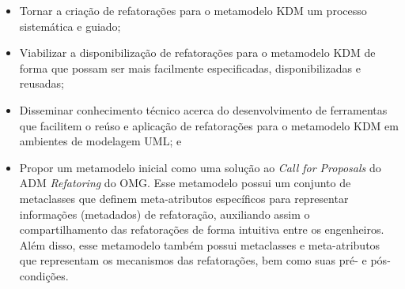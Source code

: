\begin{itemize}

    \item Tornar a criação de refatorações para o metamodelo KDM um processo sistemática e guiado;
    
    \item Viabilizar a disponibilização de refatorações para o metamodelo KDM de forma que possam ser mais facilmente especificadas, disponibilizadas e reusadas;
    
    \item Disseminar conhecimento técnico acerca do desenvolvimento de ferramentas que facilitem o reúso e aplicação de refatorações para o metamodelo KDM em ambientes de modelagem UML; e
    

    \item Propor um metamodelo inicial como uma solução ao \textit{Call for Proposals} do ADM \textit{Refatoring} do OMG. Esse metamodelo possui um conjunto de metaclasses que definem meta-atributos específicos para representar informações (metadados) de refatoração, auxiliando assim o compartilhamento das refatorações de forma intuitiva entre os engenheiros. Além disso, esse metamodelo também possui metaclasses e meta-atributos que representam os mecanismos das refatorações, bem como suas pré- e pós-condições.

	
	
	
	
	

\end{itemize}




